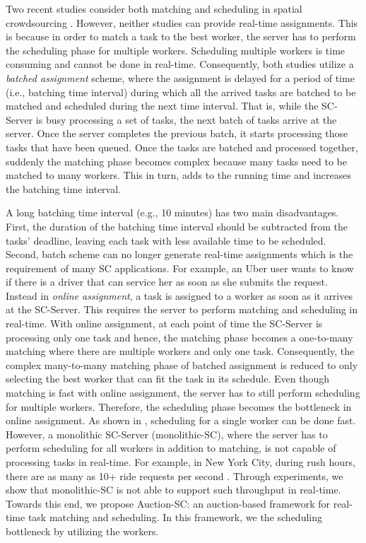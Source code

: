 Two recent studies consider both matching and scheduling in spatial crowdsourcing \cite{Deng15, Chen15}. However, neither studies can provide real-time assignments. This is because in order to match a task to the best worker, the server has to perform the scheduling phase for multiple workers. Scheduling multiple workers is time consuming and cannot be done in real-time. Consequently, both studies utilize a \textit{batched assignment} scheme, where the assignment is delayed for a period of time (i.e., batching time interval) during which all the arrived tasks are batched to be matched and scheduled during the next time interval. That is, while the SC-Server is busy processing a set of tasks, the next batch of tasks arrive at the server. Once the server completes the previous batch, it starts processing those tasks that have been queued. Once the tasks are batched and processed together, suddenly the matching phase becomes complex because many tasks need to be matched to many workers. This in turn, adds to the running time and increases the batching time interval.

A long batching time interval (e.g., 10 minutes) has two main disadvantages.  First, the duration of the batching time interval should be subtracted from the tasks' deadline, leaving each task with less available time to be scheduled. Second, batch scheme can no longer generate real-time assignments which is the requirement of many SC applications. For example, an Uber user wants to know if there is a driver that can service her as soon as she submits the request. Instead in \textit{online assignment}, a task is assigned to a worker as soon as it arrives at the SC-Server. This requires the server to perform matching and scheduling in real-time. With online assignment, at each point of time the SC-Server is processing only one task and hence, the matching phase becomes a one-to-many matching where there are multiple workers and only one task. Consequently, the complex many-to-many matching phase of batched assignment is reduced to only selecting the best worker that can fit the task in its schedule. Even though matching is fast with online assignment, the server has to still perform scheduling for multiple workers. Therefore, the scheduling phase becomes the bottleneck in online assignment. As shown in \cite{Li15}, scheduling for a single worker can be done fast. However, a monolithic\cite{Stephens15} SC-Server (monolithic-SC), where the server has to perform scheduling for all workers in addition to matching, is not capable of processing tasks in real-time. For example, in New York City, during rush hours, there are as many as 10+ ride requests per second \cite{NYCTaxi}. Through experiments, we show that monolithic-SC is not able to support such throughput in real-time. Towards this end, we propose Auction-SC: an auction-based framework for real-time task matching and scheduling. In this framework, we the scheduling bottleneck by utilizing the workers.

